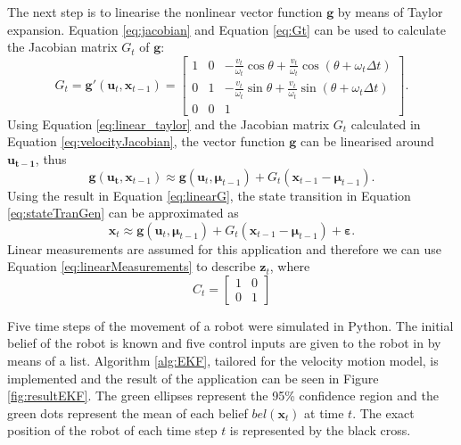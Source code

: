 \documentclass[12pt,oneside,openany,a4paper, %
afrikaans,english,
]{memoir}
\numberwithin{equation}{chapter}
\begin{document}
The next step is to linearise the nonlinear vector function $\bm{g}$ by means of Taylor expansion. Equation \ref{eq:jacobian} and Equation \ref{eq:Gt} can be used to calculate the Jacobian matrix $G_t$ of $\bm{g}$:
\begin{equation}\label{eq:velocityJacobian}
G_t = \bm{g}'(\bm{u}_t, \bm{x}_{t-1}) =
\begin{bmatrix}
1 & 0 & -\frac{v_t}{\omega_t} \cos\theta + \frac{v_t}{\omega_t} \cos(\theta + \omega_t \Delta t)\\
0 & 1 & -\frac{v_t}{\omega_t}\sin\theta + \frac{v_t}{\omega_t}\sin(\theta + \omega_t \Delta t)\\
0 & 0 & 1 
\end{bmatrix}.
\end{equation}
Using Equation \ref{eq:linear_taylor} and the Jacobian matrix $G_t$ calculated in Equation \ref{eq:velocityJacobian}, the vector function $\bm{g}$ can be linearised around $\bm{u_{t-1}}$, thus
\begin{equation}\label{eq:linearG}
\bm{g}(\bm{u_t}, \bm{x}_{t-1}) \approx \bm{g}(\bm{u}_t, \bm{\mu}_{t-1}) + G_t(\bm{x}_{t-1} - 
\bm{\mu}_{t-1}).
\end{equation} 
Using the result in Equation \ref{eq:linearG}, the state transition in Equation \ref{eq:stateTranGen} can be approximated as
\begin{equation}
\bm{x}_t \approx \bm{g}(\bm{u}_t, \bm{\mu}_{t-1}) + G_t(\bm{x}_{t-1} - \bm{\mu}_{t-1}) + \bm{\varepsilon}.
\end{equation} 
Linear measurements are assumed for this application and therefore we can use Equation \ref{eq:linearMeasurements} to describe $\bm{z}_t$,
where
\begin{equation}
C_t = 
\begin{bmatrix}
1 & 0\\
0 & 1
\end{bmatrix}
\end{equation}

Five time steps of the movement of a robot were simulated in Python. The initial belief of the robot is known and five control inputs are given to the robot in by means of a list. Algorithm \ref{alg:EKF}, tailored for the velocity motion model, is implemented and the result of the application can be seen in Figure \ref{fig:resultEKF}. The green ellipses represent the 95\% confidence region and the green dots represent the mean of each belief $bel(\bm{x}_t)$ at time $t$. The exact position of the robot of each time step $t$ is represented by the black cross.
\end{document}
